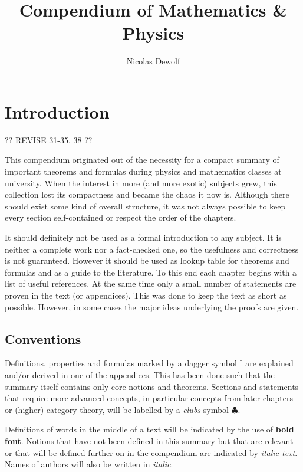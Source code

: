 \documentclass[11pt, a4paper]{report}
\begin{document}
\title{Compendium of Mathematics \& Physics}
\author{Nicolas Dewolf}
\maketitle

\tableofcontents

\chapter{Introduction}

    ?? REVISE 31-35, 38 ??


    This compendium originated out of the necessity for a compact summary of important theorems and formulas during physics and mathematics classes at university. When the interest in more (and more exotic) subjects grew, this collection lost its compactness and became the chaos it now is. Although there should exist some kind of overall structure, it was not always possible to keep every section self-contained or respect the order of the chapters.

    It should definitely not be used as a formal introduction to any subject. It is neither a complete work nor a fact-checked one, so the usefulness and correctness is not guaranteed. However it should be used as lookup table for theorems and formulas and as a guide to the literature. To this end each chapter begins with a list of useful references. At the same time only a small number of statements are proven in the text (or appendices). This was done to keep the text as short as possible. However, in some cases the major ideas underlying the proofs are given.

\section{Conventions}

    Definitions, properties and formulas marked by a dagger symbol $^\dag$ are explained and/or derived in one of the appendices. This has been done such that the summary itself contains only core notions and theorems. Sections and statements that require more advanced concepts, in particular concepts from later chapters or (higher) category theory, will be labelled by a \textit{clubs} symbol $\clubsuit$.

    Definitions of words in the middle of a text will be indicated by the use of \textbf{bold font}. Notions that have not been defined in this summary but that are relevant or that will be defined further on in the compendium are indicated by \textit{italic text}. Names of authors will also be written in \textit{italic}.
\end{document}

